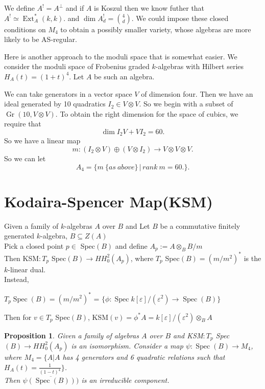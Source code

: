 \documentclass[12]{article}
\newtheorem{proposition}{Proposition}
\DeclareMathOperator{\Gr}{Gr}
\DeclareMathOperator{\Ext}{Ext}
\DeclareMathOperator{\Spec}{Spec}
\begin{document}
We define $A^! = A^\perp$ and if
$A$ is Koszul then we know futher that $A^! \simeq \Ext^*_A(k,k).$
and $\dim A^!_d = \binom{4}{d}$.  We could impose these closed conditions on $M_4$ to obtain a possibly smaller variety, whose algebras are more likely to be AS-regular.


Here is another approach to the moduli space that is somewhat easier.
We consider the moduli space of Frobenius graded $k$-algebras with Hilbert series $H_A(t) = (1+t)^4$. Let $A$ be such an algebra.

We can take generators in a vector space $V$ of dimension four.  Then
we have an ideal generated by 10 quadratics $I_2 \in V\otimes V.$
So we begin with a subset of $\Gr(10,V \otimes V).$
To obtain the right dimension for the space of cubics, we require that
$$\dim I_2 V + V I_2 = 60.$$
So we have a linear map
$$m: (I_2 \otimes V) \oplus (V \otimes I_2) \to V\otimes V \otimes V.$$
So we can let
$$A_4 = \{ m \: \lbrace as \: above \rbrace \,|\, rank \: m = 60. \}.$$

\section{Kodaira-Spencer Map(KSM)}
Given a family of $k$-algebras $A$ over $B$ and Let $B$ be a commutative finitely generated $k$-algebra, $B \subseteq Z(A)$ \\
Pick a closed point $ p \in$ Spec$(B)$ and define $A_{p} := A \otimes_{B} B/m $\\
Then KSM$:T_{p}$ Spec$(B) \rightarrow HH^{2}_{0}(A_{p})$, where
$T_{p}$ Spec$(B) = (m/m^{2})^{*} $ is the $k$-linear dual.\\

Instead,
\begin{center}
$T_{p} \Spec(B) = (m/m^{2})^{*}$ 
=  $\{\phi: \Spec k[\varepsilon]/(\varepsilon^{2}) \rightarrow  \Spec(B)\}$ \\
\end{center} 

Then for $v \in T_{p}$ Spec$(B)$, KSM$(v) = \phi^{*} A = k[\varepsilon]/(\varepsilon^{2}) \otimes_{B} A $




\begin{proposition}
Given a family of algebras $A$ over $B$ and KSM$:T_{p}$ Spec$(B) \rightarrow HH^{2}_{0}(A_{p})$ is an isomorphism. Consider a map $ \psi : \Spec(B) \rightarrow M_{4}$, where $M_{4} = \{ A | A$ has 4 generators and 6 quadratic relations such that $H_{A} (t) = \frac{1}{(1-t)^{4}}\}$.\\

Then $\overline{\psi( \Spec(B) ))}$ is an irreducible component.


\end{proposition}
\end{document}

